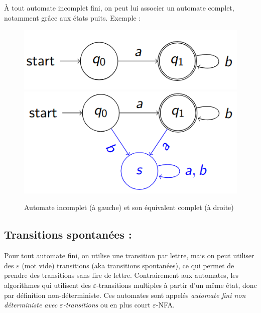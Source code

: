 \documentclass{article}
\begin{document}
À tout automate incomplet fini, on peut lui associer un automate complet, notamment grâce aux états puits. Exemple :
\begin{figure}[h]
    \centering
    \includegraphics[scale=0.3]{uncomplete_automaton.png}
    \includegraphics[scale=0.3]{complete_automaton.png}
    \caption{Automate incomplet (à gauche) et son équivalent complet (à droite)}   
\end{figure}

\subsection{Transitions spontanées :}
Pour tout automate fini, on utilise une transition par lettre, mais on peut utiliser des $\varepsilon$ (mot vide) transitions (aka transitions spontanées), ce qui permet de prendre des transitions sans lire de lettre.\newline
Contrairement aux automates, les algorithmes qui utilisent des $\varepsilon$-transitions multiples à partir d'un même état, donc par définition non-déterministe. Ces automates sont appelés \textit{automate fini non déterministe avec $\varepsilon$-transitions} ou en plus court $\varepsilon$-NFA.\newline
\end{document}
